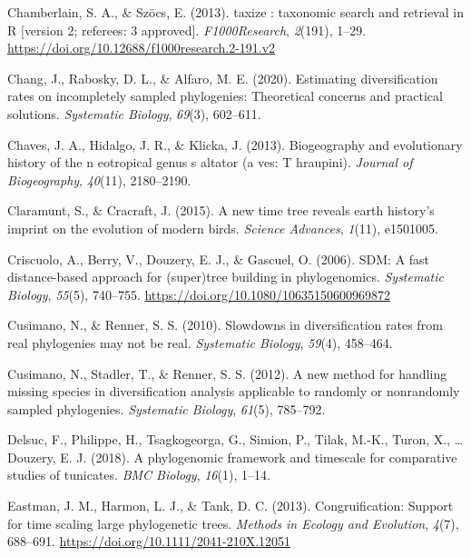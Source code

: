 \documentclass[english,man]{apa6}
\begin{document}
\leavevmode\hypertarget{ref-Chamberlain2013}{}%
Chamberlain, S. A., \& Szöcs, E. (2013). taxize : taxonomic search and retrieval in R {[}version 2; referees: 3 approved{]}. \emph{F1000Research}, \emph{2}(191), 1--29. \url{https://doi.org/10.12688/f1000research.2-191.v2}

\leavevmode\hypertarget{ref-chang2020estimating}{}%
Chang, J., Rabosky, D. L., \& Alfaro, M. E. (2020). Estimating diversification rates on incompletely sampled phylogenies: Theoretical concerns and practical solutions. \emph{Systematic Biology}, \emph{69}(3), 602--611.

\leavevmode\hypertarget{ref-chaves2013biogeography}{}%
Chaves, J. A., Hidalgo, J. R., \& Klicka, J. (2013). Biogeography and evolutionary history of the n eotropical genus s altator (a ves: T hraupini). \emph{Journal of Biogeography}, \emph{40}(11), 2180--2190.

\leavevmode\hypertarget{ref-claramunt2015new}{}%
Claramunt, S., \& Cracraft, J. (2015). A new time tree reveals earth history's imprint on the evolution of modern birds. \emph{Science Advances}, \emph{1}(11), e1501005.

\leavevmode\hypertarget{ref-Criscuolo2006}{}%
Criscuolo, A., Berry, V., Douzery, E. J., \& Gascuel, O. (2006). SDM: A fast distance-based approach for (super)tree building in phylogenomics. \emph{Systematic Biology}, \emph{55}(5), 740--755. \url{https://doi.org/10.1080/10635150600969872}

\leavevmode\hypertarget{ref-cusimano2010slowdowns}{}%
Cusimano, N., \& Renner, S. S. (2010). Slowdowns in diversification rates from real phylogenies may not be real. \emph{Systematic Biology}, \emph{59}(4), 458--464.

\leavevmode\hypertarget{ref-cusimano2012new}{}%
Cusimano, N., Stadler, T., \& Renner, S. S. (2012). A new method for handling missing species in diversification analysis applicable to randomly or nonrandomly sampled phylogenies. \emph{Systematic Biology}, \emph{61}(5), 785--792.

\leavevmode\hypertarget{ref-delsuc2018phylogenomic}{}%
Delsuc, F., Philippe, H., Tsagkogeorga, G., Simion, P., Tilak, M.-K., Turon, X., \ldots{} Douzery, E. J. (2018). A phylogenomic framework and timescale for comparative studies of tunicates. \emph{BMC Biology}, \emph{16}(1), 1--14.

\leavevmode\hypertarget{ref-Eastman2013}{}%
Eastman, J. M., Harmon, L. J., \& Tank, D. C. (2013). Congruification: Support for time scaling large phylogenetic trees. \emph{Methods in Ecology and Evolution}, \emph{4}(7), 688--691. \url{https://doi.org/10.1111/2041-210X.12051}
\end{document}
